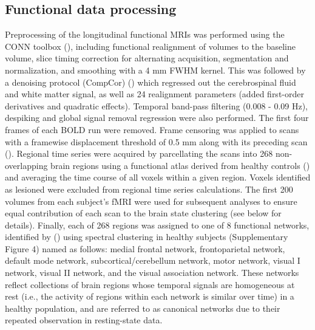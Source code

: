 \documentclass[phd,tocprelim]{cornell}
\begin{document}
	\subsection{Functional data processing}
	Preprocessing of the longitudinal functional MRIs was performed using the CONN toolbox (\cite{Whitfield-Gabrieli2012-ox}), including functional realignment of volumes to the baseline volume, slice timing correction for alternating acquisition, segmentation and normalization, and smoothing with a 4 mm FWHM kernel. This was followed by a denoising protocol (CompCor) (\cite{Behzadi2007-zt}) which regressed out the cerebrospinal fluid and white matter signal, as well as 24 realignment parameters (added first-order derivatives and quadratic effects). Temporal band-pass filtering (0.008 - 0.09 Hz), despiking and global signal removal regression were also performed. The first four frames of each BOLD run were removed. Frame censoring was applied to scans with a framewise displacement threshold of 0.5 mm along with its preceding scan (\cite{Power2012-tq}). Regional time series were acquired by parcellating the scans into 268 non-overlapping brain regions using a functional atlas derived from healthy controls (\cite{Shen2013-zn}) and averaging the time course of all voxels within a given region. Voxels identified as lesioned were excluded from regional time series calculations. The first 200 volumes from each subject's fMRI were used for subsequent analyses to ensure equal contribution of each scan to the brain state clustering (see below for details). Finally, each of 268 regions was assigned to one of 8 functional networks, identified by (\cite{Finn2015-er}) using spectral clustering in healthy subjects (Supplementary Figure 4) named as follows: medial frontal network, frontoparietal network, default mode network, subcortical/cerebellum network, motor network, visual I network, visual II network, and the visual association network. These networks reflect collections of brain regions whose temporal signals are homogeneous at rest (i.e., the activity of regions within each network is similar over time) in a healthy population, and are referred to as canonical networks due to their repeated observation in resting-state data.
	
\end{document}
